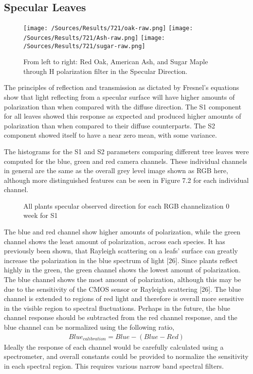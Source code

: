 \subsection{Specular Leaves}
%
\begin{figure}[htp]
    \centering
    \texttt{[image: /Sources/Results/721/oak-raw.png]}\hfill
    \texttt{[image: /Sources/Results/721/Ash-raw.png]}\hfill
    \texttt{[image: /Sources/Results/721/sugar-raw.png]}

    \caption{From left to right: Red Oak, American Ash, and Sugar Maple through H polarization filter in the Specular Direction.}
    \label{fig:specular-raw}
\end{figure}
%
The principles of reflection and transmission as dictated by Fresnel’s equations show that light reflecting from a specular surface will have higher amounts of polarization than when compared with the diffuse direction.  The S1 component for all leaves showed this response as expected and produced higher amounts of polarization than when compared to their diffuse counterparts.  The S2 component showed itself to have a near zero mean, with some variance.

The histograms for the S1 and S2 parameters comparing different tree leaves were computed for the blue, green and red camera channels.  These individual channels in general are the same as the overall grey level image shown as RGB here, although more distinguished features can be seen in Figure 7.2 for each individual channel.
%
\begin{figure}[!htb]
    \begin{center}
    \end{center}
    \caption{All plants specular observed direction for each RGB channelization 0 week for S1}
    \label{fig:polarization}
\end{figure}
%
The blue and red channel show higher amounts of polarization, while the green channel shows the least amount of polarization, across each species.  It has previously been shown, that Rayleigh scattering on a leafs' surface can greatly increase the polarization in the blue spectrum of light [26].  Since plants reflect highly in the green, the green channel shows the lowest amount of polarization.  The blue channel shows the most amount of polarization, although this may be due to the sensitivity of the CMOS sensor or Rayleigh scattering [26].  The blue channel is extended to regions of red light and therefore is overall more sensitive in the visible region to spectral fluctuations.  Perhaps in the future, the blue channel response should be subtracted from the red channel response, and the blue channel can be normalized using the following ratio,
%
\begin{align}
    Blue_{calibration} = Blue - (Blue - Red)
\end{align}
%
Ideally the response of each channel would be carefully calculated using a spectrometer, and overall constants could be provided to normalize the sensitivity in each spectral region.  This requires various narrow band spectral filters.

